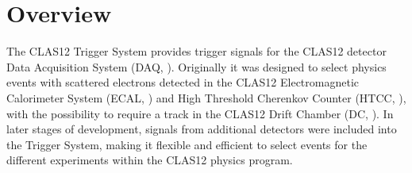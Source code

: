 \section{Overview}

The CLAS12 Trigger System provides trigger signals for the CLAS12 detector Data Acquisition System (DAQ, \cite{daq-ref}). Originally it was designed to select physics events with scattered electrons detected in the CLAS12 Electromagnetic Calorimeter System (ECAL, \cite{ec-ref}) and High Threshold Cherenkov Counter (HTCC, \cite{htcc-ref}), with the possibility to require a track in the CLAS12 Drift Chamber (DC, \cite{dc-ref}). In later stages of development, signals from additional detectors were included into the Trigger System, making it flexible and efficient to select events for the different experiments within the CLAS12 physics program.



